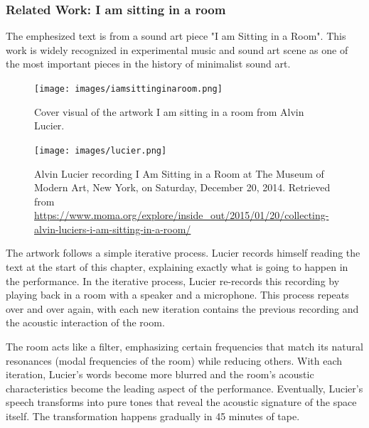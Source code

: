             \subsubsection{Related Work: I am sitting in a room}
        
                The emphesized text is from a sound art piece "I am Sitting in a Room". This work is widely recognized in experimental music and sound art scene as one of the most important pieces in the history of minimalist sound art\cite{Lucier_phd}.\par

                \begin{figure}[H]
                    \centering
                    \texttt{[image: images/iamsittinginaroom.png]}
                    \caption{Cover visual of the artwork I am sitting in a room from Alvin Lucier.}
                    \label{fig:IASIAR}
                \end{figure}

                \begin{figure}[H]
                    \centering
                    \texttt{[image: images/lucier.png]}
                    \caption{Alvin Lucier recording I Am Sitting in a Room at The Museum of Modern Art, New York, on Saturday, December 20, 2014. Retrieved from \url{https://www.moma.org/explore/inside_out/2015/01/20/collecting-alvin-luciers-i-am-sitting-in-a-room/}}
                    \label{fig:LUCIER}
                \end{figure}            

                The artwork follows a simple iterative process. Lucier records himself reading the text at the start of this chapter, explaining exactly what is going to happen in the performance. In the iterative process, Lucier re-records this recording by playing back in a room with a speaker and a microphone. This process repeats over and over again, with each new iteration contains the previous recording and the acoustic interaction of the room\cite{Alvin_Lucier_I_am_Sitting_in_a_Room}.\par

                The room acts like a filter, emphasizing certain frequencies that match its natural resonances (modal frequencies of the room\cite{Room_Acoustics}) while reducing others. With each iteration, Lucier's words become more blurred and the room's acoustic characteristics become the leading aspect of the performance. Eventually, Lucier's speech transforms into pure tones that reveal the acoustic signature of the space itself. The transformation happens gradually in 45 minutes of tape\cite{MoMa_Lucier}.\par
                
